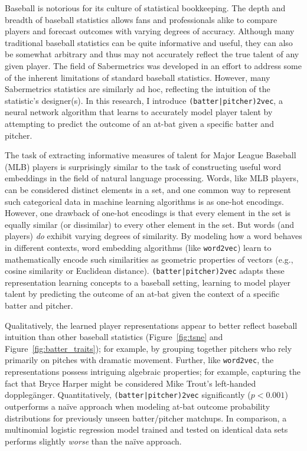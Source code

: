 \documentclass{article}
\begin{document}
\begin{center}

\end{center}

Baseball is notorious for its culture of statistical bookkeeping. The depth and breadth of baseball statistics allows fans and professionals alike to compare players and forecast outcomes with varying degrees of accuracy. Although many traditional baseball statistics can be quite informative and useful, they can also be somewhat arbitrary and thus may not accurately reflect the true talent of any given player. The field of Sabermetrics was developed in an effort to address some of the inherent limitations of standard baseball statistics. However, many Sabermetrics statistics are similarly ad hoc, reflecting the intuition of the statistic's designer(s). In this research, I introduce \texttt{(batter|pitcher)2vec}, a neural network algorithm that learns to accurately model player talent by attempting to predict the outcome of an at-bat given a specific batter and pitcher.

The task of extracting informative measures of talent for Major League Baseball (MLB) players is surprisingly similar to the task of constructing useful word embeddings in the field of natural language processing. Words, like MLB players, can be considered distinct elements in a set, and one common way to represent such categorical data in machine learning algorithms is as one-hot encodings. However, one drawback of one-hot encodings is that every element in the set is equally similar (or dissimilar) to every other element in the set. But words (and players) \emph{do} exhibit varying degrees of similarity. By modeling how a word behaves in different contexts, word embedding algorithms (like \texttt{word2vec}) learn to mathematically encode such similarities as geometric properties of vectors (e.g., cosine similarity or Euclidean distance). \texttt{(batter|pitcher)2vec} adapts these representation learning concepts to a baseball setting, learning to model player talent by predicting the outcome of an at-bat given the context of a specific batter and pitcher.

Qualitatively, the learned player representations appear to better reflect baseball intuition than other baseball statistics (Figure~\ref{fig:tsne} and Figure~\ref{fig:batter_traits}); for example, by grouping together pitchers who rely primarily on pitches with dramatic movement. Further, like \texttt{word2vec}, the representations possess intriguing algebraic properties; for example, capturing the fact that Bryce Harper might be considered Mike Trout's left-handed dopplegänger. Quantitatively, \texttt{(batter|pitcher)2vec} significantly ($p < 0.001$) outperforms a naïve approach when modeling at-bat outcome probability distributions for previously unseen batter/pitcher matchups. In comparison, a multinomial logistic regression model trained and tested on identical data sets performs slightly \emph{worse} than the naïve approach.
\end{document}
